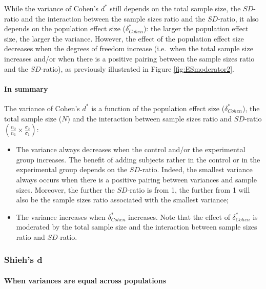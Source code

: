 \documentclass[
  english,
  man,mask]{apa6}
\providecommand{\tightlist}{%
  \setlength{\itemsep}{0pt}\setlength{\parskip}{0pt}}
\let\oldparagraph\paragraph
\renewcommand{\paragraph}[1]{\oldparagraph{#1}\mbox{}}
\begin{document}
While the variance of Cohen's \(d^*\) still depends on the total sample size, the \(SD\)-ratio and the interaction between the sample sizes ratio and the \(SD\)-ratio, it also depends on the population effect size (\(\delta^*_{Cohen}\)): the larger the population effect size, the larger the variance. However, the effect of the population effect size decreases when the degrees of freedom increase (i.e.~when the total sample size increases and/or when there is a positive pairing between the sample sizes ratio and the \(SD\)-ratio), as previously illustrated in Figure \ref{fig:ESmoderator2}.

\hypertarget{in-summary-3}{%
\paragraph{In summary}\label{in-summary-3}}

The variance of Cohen's \(d^*\) is a function of the population effect size (\(\delta^*_{Cohen}\)), the total sample size (\(N\)) and the interaction between sample sizes ratio and \(SD\)-ratio \(\left(\frac{n_2}{n_1}\times\frac{\sigma_2}{\sigma_1} \right)\):

\begin{itemize}
\tightlist
\item
  The variance always decreases when the control and/or the experimental group increases. The benefit of adding subjects rather in the control or in the experimental group depends on the \(SD\)-ratio. Indeed, the smallest variance always occurs when there is a positive pairing between variances and sample sizes. Moreover, the further the \(SD\)-ratio is from 1, the further from 1 will also be the sample sizes ratio associated with the smallest variance;\\
\item
  The variance increases when \(\delta^*_{Cohen}\) increases. Note that the effect of \(\delta^*_{Cohen}\) is moderated by the total sample size and the interaction between sample sizes ratio and \(SD\)-ratio.
\end{itemize}

\hypertarget{shiehs-bmd}{%
\subsubsection{\texorpdfstring{Shieh's \(\bm{d}\)}{Shieh's \textbackslash bm\{d\}}}\label{shiehs-bmd}}

\hypertarget{when-variances-are-equal-across-populations-5}{%
\paragraph{When variances are equal across populations}\label{when-variances-are-equal-across-populations-5}}
\end{document}
